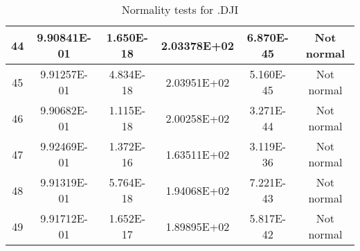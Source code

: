 \begin{table}[h]
\begin{tabular}{|c|c|c|c|c|c|}
		44 & 9.90841E-01 & 1.650E-18 & 2.03378E+02 & 6.870E-45 & Not normal\\\hline
		45 & 9.91257E-01 & 4.834E-18 & 2.03951E+02 & 5.160E-45 & Not normal\\\hline
		46 & 9.90682E-01 & 1.115E-18 & 2.00258E+02 & 3.271E-44 & Not normal\\\hline
		47 & 9.92469E-01 & 1.372E-16 & 1.63511E+02 & 3.119E-36 & Not normal\\\hline
		48 & 9.91319E-01 & 5.764E-18 & 1.94068E+02 & 7.221E-43 & Not normal\\\hline
		49 & 9.91712E-01 & 1.652E-17 & 1.89895E+02 & 5.817E-42 & Not normal\\\hline
	\end{tabular}
	\caption{Normality tests for .DJI}
	\label{tab:normality_tests_DJI}
\end{table}
